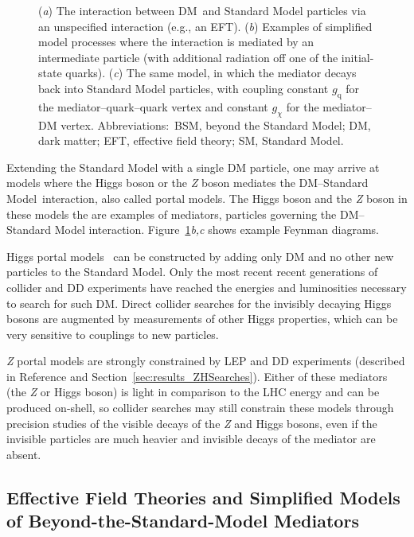 \documentclass{ar-1col}
\newcommand{\chiDM}{\ensuremath{\chi}\xspace}
\newcommand{\IP}{invisible particle}
\newcommand{\gDM}{\ensuremath{g_{\chiDM}}\xspace}
\newcommand{\gdm}{\gDM}
\newcommand{\gq}{$g_{\mathrm{q}}$\xspace}
\begin{document}
{\begin{figure}[!htpb]
\caption{(\textit{a}) The interaction between DM\ and Standard Model particles via an unspecified interaction (e.g., an EFT).
(\textit{b}) Examples of simplified model processes where the interaction is mediated by an intermediate particle (with additional radiation off one of the initial-state quarks). 
(\textit{c}) The same model, in which  the mediator decays back into Standard Model particles, with coupling constant  \gq  for the mediator--quark--quark vertex and constant  \gdm for the mediator--DM vertex. 
Abbreviations:\ BSM, beyond the Standard Model; DM, dark matter; EFT, effective field theory; SM, Standard Model. \label{fig:feynman_0}}
\end{figure}

Extending the Standard Model with a single DM particle, one
may arrive at models where the Higgs boson or the \textit{Z} boson mediates
the DM--Standard Model\  interaction, also called portal models. 
The Higgs boson and the \textit{Z} boson in these models the are examples of {mediators}, 
particles governing the DM--Standard Model interaction. 
Figure~\ref{fig:feynman_0}\textit{b,c} shows example Feynman diagrams.

{Higgs portal} models~\cite{Patt:2006fw,Djouadi:2011aa} can be constructed by adding only DM and no other new particles to the Standard Model. 
Only the most recent recent generations of collider and DD
experiments have reached the energies and luminosities necessary to
search for such DM. Direct collider searches for the
invisibly decaying Higgs bosons are augmented by measurements of
other Higgs properties, which can be very sensitive to couplings
to new particles.

{\textit{Z} portal} models are strongly constrained
by LEP and DD experiments (described in Reference  and Section~\ref{sec:results_ZHSearches}). 
Either of these mediators (the \textit{Z} or Higgs boson) is light in
comparison to the LHC energy and can be produced on-shell, so
collider searches may still constrain these models 
through precision studies of the visible decays of the \textit{Z} and Higgs bosons, 
even if the {\IP}s are much heavier and invisible decays of the mediator
are absent. 

\subsection{Effective Field Theories and Simplified Models of Beyond-the-Standard-Model Mediators}\label{sec:BSMMediatorModels}

}
\end{document}
